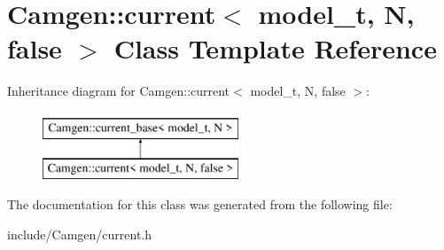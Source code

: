 \hypertarget{a00109}{\section{Camgen\-:\-:current$<$ model\-\_\-t, N, false $>$ Class Template Reference}
\label{a00109}
}
Inheritance diagram for Camgen\-:\-:current$<$ model\-\_\-t, N, false $>$\-:\begin{figure}[H]
\begin{center}
\leavevmode
\includegraphics[height=2.000000cm]{a00109}
\end{center}
\end{figure}


The documentation for this class was generated from the following file\-:\begin{DoxyCompactItemize}
\item 
include/\-Camgen/current.\-h\end{DoxyCompactItemize}
